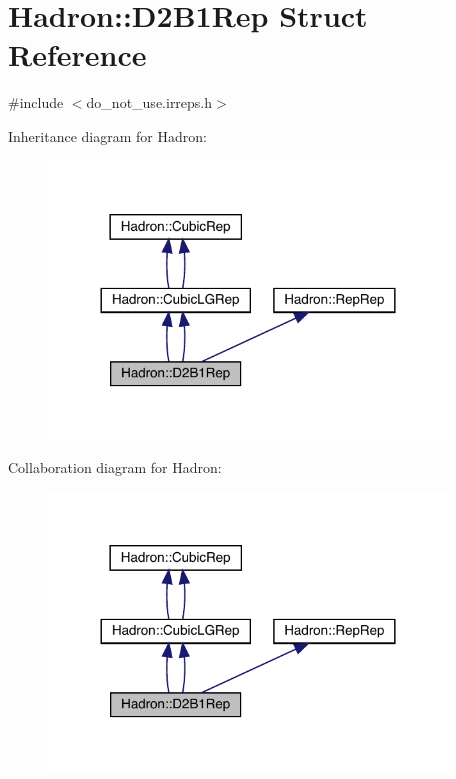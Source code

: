 \hypertarget{structHadron_1_1D2B1Rep}{}\section{Hadron\+:\+:D2\+B1\+Rep Struct Reference}
\label{structHadron_1_1D2B1Rep}


{\ttfamily \#include $<$do\+\_\+not\+\_\+use.\+irreps.\+h$>$}



Inheritance diagram for Hadron\+:\nopagebreak
\begin{figure}[H]
\begin{center}
\leavevmode
\includegraphics[width=300pt]{d8/d3f/structHadron_1_1D2B1Rep__inherit__graph}
\end{center}
\end{figure}


Collaboration diagram for Hadron\+:\nopagebreak
\begin{figure}[H]
\begin{center}
\leavevmode
\includegraphics[width=300pt]{da/d6c/structHadron_1_1D2B1Rep__coll__graph}
\end{center}
\end{figure}

